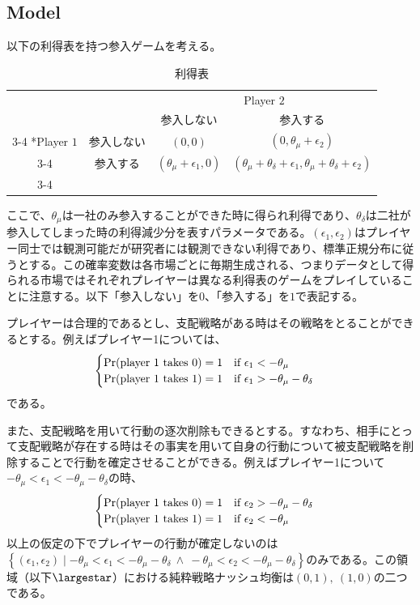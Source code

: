 \documentclass{jsarticle}
\begin{document}
\subsection{Model}
以下の利得表を持つ参入ゲームを考える。
\begin{table}[h]
    \caption{利得表}
    \centering
    \setlength{\extrarowheight}{2pt}
    \begin{tabular}{cc|c|c|}
      & \multicolumn{1}{c}{} & \multicolumn{2}{c}{Player $2$}\\
      & \multicolumn{1}{c}{} & \multicolumn{1}{c}{参入しない}  & \multicolumn{1}{c}{参入する} \\\cline{3-4}
      \multirow{2}*{Player $1$}  & 参入しない & $(0,0)$ & $(0,\theta_{\mu}+\epsilon_2)$ \\\cline{3-4}
      & 参入する & $(\theta_{\mu}+\epsilon_1,0)$ & $(\theta_{\mu}+\theta_{\delta}+\epsilon_1, \theta_{\mu}+\theta_{\delta}+\epsilon_2)$ \\\cline{3-4}
    \end{tabular}
\end{table}
ここで、$\theta_{\mu}$は一社のみ参入することができた時に得られ利得であり、$\theta_{\delta}$は二社が参入してしまった時の利得減少分を表すパラメータである。$(\epsilon_1, \epsilon_2)$はプレイヤー同士では観測可能だが研究者には観測できない利得であり、標準正規分布に従うとする。この確率変数は各市場ごとに毎期生成される、つまりデータとして得られる市場ではそれぞれプレイヤーは異なる利得表のゲームをプレイしていることに注意する。以下「参入しない」を$0$、「参入する」を$1$で表記する。

プレイヤーは合理的であるとし、支配戦略がある時はその戦略をとることができるとする。例えばプレイヤー1については、
\begin{align*}
	\begin{cases}
		{\rm Pr}(\text{player 1 takes $0$}) = 1\quad \text{if}\ \epsilon_1 < -\theta_{\mu}\\
		{\rm Pr}(\text{player 1 takes $1$}) = 1\quad \text{if}\ \epsilon_1 > -\theta_{\mu} - \theta_{\delta}
	\end{cases}
\end{align*}
である。

また、支配戦略を用いて行動の逐次削除もできるとする。すなわち、相手にとって支配戦略が存在する時はその事実を用いて自身の行動について被支配戦略を削除することで行動を確定させることができる。例えばプレイヤー1について$-\theta_{\mu} < \epsilon_1 < -\theta_{\mu} - \theta_{\delta}$の時、
\begin{align*}
	\begin{cases}
		{\rm Pr}(\text{player 1 takes $0$}) = 1\quad \text{if}\ \epsilon_2 > -\theta_{\mu} - \theta_{\delta}\\
		{\rm Pr}(\text{player 1 takes $1$}) = 1\quad \text{if}\ \epsilon_2 < -\theta_{\mu}
	\end{cases}
\end{align*}
以上の仮定の下でプレイヤーの行動が確定しないのは$\left\{ (\epsilon_1, \epsilon_2) \mid -\theta_{\mu} < \epsilon_1 < -\theta_{\mu} - \theta_{\delta}\ \wedge\  -\theta_{\mu} < \epsilon_2 < -\theta_{\mu} - \theta_{\delta} \right\}$のみである。この領域（以下$\largestar$）における純粋戦略ナッシュ均衡は$(0,1),\ (1,0)$の二つである。
\end{document}
